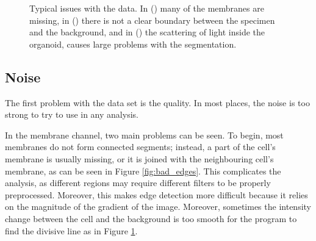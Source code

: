 \documentclass[
  digital,     %
  oneside,     %
  nosansbold,  %
  nocolorbold, %
  lof,         %
  lot,         %
]{fithesis4}
\begin{document}
\begin{figure}
\begin{subfigure}[t]{0.3\textwidth}
        \caption{}
        \label{fig:bleeding_edges}
    \end{subfigure}
    \hfill
    \begin{subfigure}[t]{0.5\textwidth}
        \centering
        \caption{}
        \label{fig:scattering}
    \end{subfigure}
    \caption{Typical issues with the data. In () many of the membranes are missing, in () there is not a clear boundary between the specimen and the background, and in () the scattering of light inside the organoid, causes large problems with the segmentation.}
\end{figure}

\subsection{Noise}

The first problem with the data set is the quality. In most places, the noise is
too strong to try to use in any analysis.

In the membrane channel, two main problems can be seen. To begin, most
membranes do not form connected segments; instead, a part of the cell's membrane is
usually missing, or it is joined with the neighbouring cell's membrane, as can be
seen in Figure \ref{fig:bad_edges}. This complicates the analysis, as different
regions may require different filters to be properly preprocessed. Moreover,
this makes edge detection more difficult because it relies on the magnitude of
the gradient of the image. Moreover, sometimes the intensity change between the cell and the
background is too smooth for the program to find the divisive line as in Figure
\ref{fig:bleeding_edges}.
\end{document}
